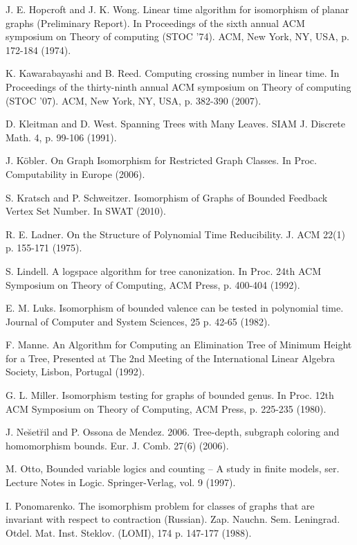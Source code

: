 \documentclass[11pt]{report}
\begin{document}
\begin{thebibliography}{9}
J. E. Hopcroft and J. K. Wong. Linear time algorithm for isomorphism of planar graphs (Preliminary Report). In Proceedings of the sixth annual ACM symposium on Theory of computing (STOC '74). ACM, New York, NY, USA, p. 172-184 (1974).

K.  Kawarabayashi and B. Reed. Computing crossing number in linear time. In Proceedings of the thirty-ninth annual ACM symposium on Theory of computing (STOC '07). ACM, New York, NY, USA, p. 382-390 (2007).

D. Kleitman and D. West. Spanning Trees with Many Leaves. SIAM J. Discrete Math. 4, p. 99-106 (1991).

J. K\"obler. On Graph Isomorphism for Restricted Graph Classes. In Proc. Computability in Europe (2006).

S. Kratsch and P. Schweitzer. Isomorphism of Graphs of Bounded Feedback Vertex Set Number. In SWAT (2010).

R. E. Ladner. On the Structure of Polynomial Time Reducibility. J. ACM 22(1) p. 155-171 (1975).

S. Lindell. A logspace algorithm for tree canonization. In Proc. 24th ACM Symposium on Theory of Computing, ACM Press, p. 400-404 (1992).

E. M. Luks. Isomorphism of bounded valence can be tested in polynomial time. Journal of Computer and System Sciences, 25 p. 42-65 (1982).

F. Manne. An Algorithm for Computing an Elimination Tree of Minimum Height for a Tree, Presented at The 2nd Meeting of the International Linear Algebra Society, Lisbon, Portugal (1992). 

G. L. Miller. Isomorphism testing for graphs of bounded genus. In Proc. 12th ACM Symposium on Theory of Computing, ACM Press, p. 225-235 (1980).

J. Ne\u{s}et\u{r}il and P. Ossona de Mendez. 2006. Tree-depth, subgraph coloring and homomorphism bounds. Eur. J. Comb. 27(6) (2006).

M. Otto, Bounded variable logics and counting – A study in finite models, ser. Lecture Notes in Logic. Springer-Verlag,  vol. 9 (1997).

I. Ponomarenko. The isomorphism problem for classes of graphs that are invariant with respect to contraction (Russian). Zap. Nauchn. Sem. Leningrad. Otdel. Mat. Inst. Steklov. (LOMI), 174 p. 147-177 (1988).


\end{thebibliography}
\end{document}
